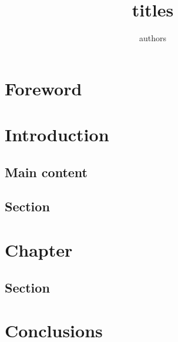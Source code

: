 \documentclass[fontsize=14pt,DIV=calc]{scrreport}
\title{titles}
\author{authors}
\begin{document}
\maketitle
\tableofcontents
{}
\chapter*{Foreword}

\chapter{Introduction}

\section{Main content}
\section{Section}
\chapter{Chapter}
\section{Section}
\chapter{Conclusions}
\nocite{*}
\printbibliography
\end{document}
